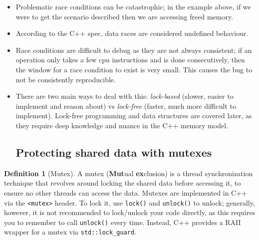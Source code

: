 \documentclass[11pt, a4paper]{article}
\theoremstyle{definition}
\newtheorem{definition}[theorem]{Definition}
\theoremstyle{remark}
\newcommand{\code}[1]{\lstinline|#1|}
\begin{document}
\begin{itemize}
\begin{definition}[Race Condition]
    \end{definition}
    \item Problematic race conditions can be catastrophic; in the example above, if we were to get the scenario described then we are accessing freed memory.
    \item According to the C++ spec, data races are considered undefined behaviour.
    \item Race conditions are difficult to debug as they are not always consistent; if an operation only takes a few cpu instructions and is done consecutively, then the window for a race condition to exist is very small. This causes the bug to not be consistently reproducible.
    \item There are two main ways to deal with this: \textit{lock-based} (slower, easier to implement and reason about) vs \textit{lock-free} (faster, much more difficult to implement). Lock-free programming and data structures are covered later, as they require deep knowledge and nuance in the C++ memory model.
    \subsection{Protecting shared data with mutexes}
\end{itemize}
\begin{definition}[Mutex]
    A mutex (\textbf{Mut}ual \textbf{ex}clusion) is a thread synchronization technique that revolves around locking the shared data before accessing it, to ensure no other threads can access the data. Mutexes are implemented in C++ via the \code{<mutex>} header. To lock it, use \code{lock()} and \code{unlock()} to unlock; generally, however, it is not recommended to lock/unlock your code directly, as this requires you to remember to call \code{unlock()} every time. Instead, C++ provides a RAII wrapper for a mutex via \code{std::lock_guard}.
\end{definition}
\end{document}
